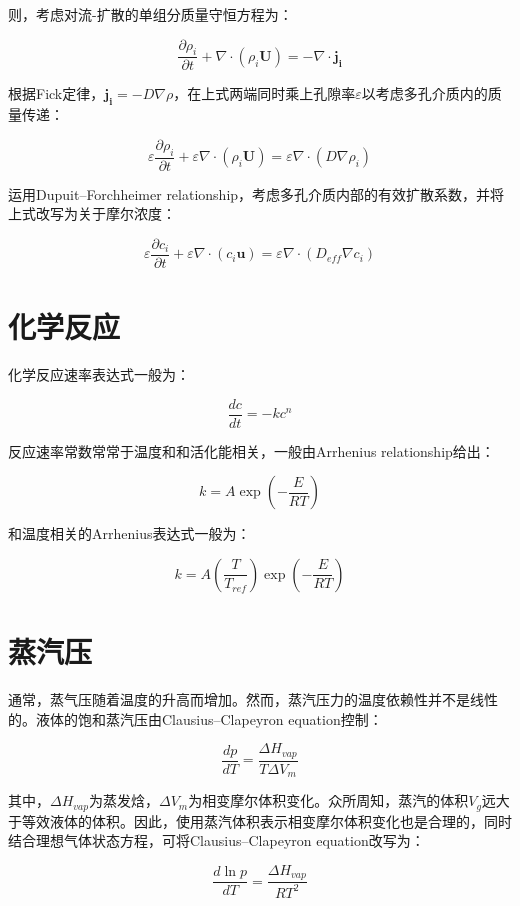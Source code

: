 则，考虑对流-扩散的单组分质量守恒方程为：

\begin{equation}
\frac{\partial \rho_i}{\partial t} + \nabla\cdot(\rho_i\bm{U}) = -\nabla\cdot \bm{j_i}
\end{equation}

根据Fick定律，$ \bm{j_i} = -D\nabla\rho $，在上式两端同时乘上孔隙率$ \varepsilon $以考虑多孔介质内的质量传递：

\begin{equation}
\varepsilon\frac{\partial \rho_i}{\partial t} + \varepsilon\nabla\cdot(\rho_i\bm{U}) = \varepsilon\nabla\cdot(D\nabla \rho_i)
\end{equation}

运用Dupuit–Forchheimer relationship，考虑多孔介质内部的有效扩散系数，并将上式改写为关于摩尔浓度：

\begin{equation}
\varepsilon\frac{\partial c_i}{\partial t} + \varepsilon\nabla\cdot(c_i\bm{u}) = \varepsilon\nabla\cdot(D_{eff}\nabla c_i)
\end{equation}

\section{化学反应}

化学反应速率表达式一般为：

\begin{equation}
\frac{dc}{dt} = -kc^n
\end{equation}

反应速率常数常常于温度和和活化能相关，一般由Arrhenius relationship给出：

\begin{equation}
k = A \exp(-\frac{E}{RT})
\end{equation}

和温度相关的Arrhenius表达式一般为：

\begin{equation}
k = A \left( \frac{T}{T_{ref}} \right) \exp(-\frac{E}{RT})
\end{equation}

\section{蒸汽压}

通常，蒸气压随着温度的升高而增加。然而，蒸汽压力的温度依赖性并不是线性的。液体的饱和蒸汽压由Clausius–Clapeyron equation控制：

\begin{equation}
\frac{dp}{dT} = \frac{\Delta H_{vap}}{T\Delta V_m}
\end{equation}

其中，$ \Delta H_{vap} $为蒸发焓，$ \Delta V_m $为相变摩尔体积变化。众所周知，蒸汽的体积$ V_g $远大于等效液体的体积。因此，使用蒸汽体积表示相变摩尔体积变化也是合理的，同时结合理想气体状态方程，可将Clausius–Clapeyron equation改写为：

\begin{equation}
\frac{d\ln p}{dT} = \frac{\Delta H_{vap}}{RT^2}
\end{equation}
















